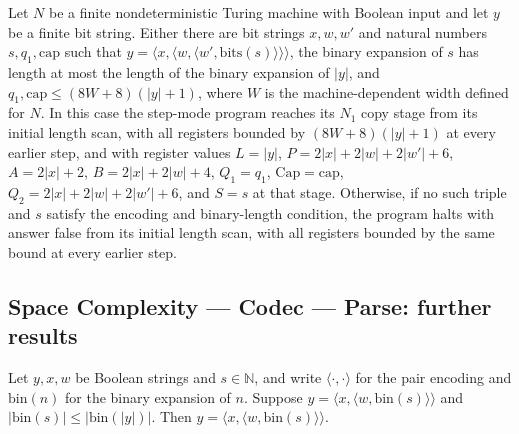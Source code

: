 \begin{theorem}
\leanok
{}
Let $N$ be a finite nondeterministic Turing machine with Boolean input and let $y$ be a
finite bit string. Either there are bit strings $x,w,w'$ and natural numbers
$s,q_1,\mathrm{cap}$ such that $y=\langle x,\langle w,\langle
w',\mathrm{bits}(s)\rangle\rangle\rangle$, the binary expansion of $s$ has length at
most the length of the binary expansion of $|y|$, and $q_1,\mathrm{cap}\le
(8W+8)(|y|+1)$, where $W$ is the machine-dependent width defined for $N$. In this case
the step-mode program reaches its $N_1$ copy stage from its initial length scan, with
all registers bounded by $(8W+8)(|y|+1)$ at every earlier step, and with register values
$L=|y|$, $P=2|x|+2|w|+2|w'|+6$, $A=2|x|+2$, $B=2|x|+2|w|+4$, $Q_1=q_1$,
$\mathrm{Cap}=\mathrm{cap}$, $Q_2=2|x|+2|w|+2|w'|+6$, and $S=s$ at that stage.
Otherwise, if no such triple and $s$ satisfy the encoding and binary-length condition,
the program halts with answer false from its initial length scan, with all registers
bounded by the same bound at every earlier step.
\end{theorem}

\subsection*{Space Complexity --- Codec --- Parse: further results}

\begin{lemma}
\label{Complexity.Codec.Shape1.eq}
\leanok
{}
Let $y,x,w$ be Boolean strings and $s\in\mathbb{N}$, and write
$\langle\cdot,\cdot\rangle$ for the pair encoding and $\mathrm{bin}(n)$ for the binary
expansion of $n$. Suppose $y=\langle x,\langle w,\mathrm{bin}(s)\rangle\rangle$ and
$|\mathrm{bin}(s)|\le|\mathrm{bin}(|y|)|$. Then
$y=\langle x,\langle w,\mathrm{bin}(s)\rangle\rangle$.
\end{lemma}

